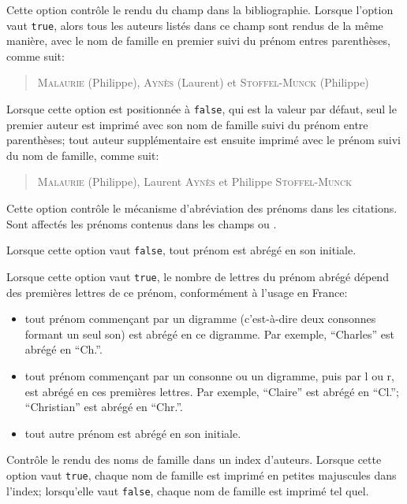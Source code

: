\documentclass{ltxdockit}
\begin{document}
\begin{optionlist}
Cette option contrôle le rendu du champ  dans la bibliographie. Lorsque l'option vaut \texttt{true}, alors tous les auteurs listés dans ce champ sont rendus de la même manière, avec le nom de famille en premier suivi du prénom entres parenthèses, comme suit:
\begin{quote}
\textsc{Malaurie} (Philippe), \textsc{Aynès} (Laurent) et \textsc{Stoffel-Munck} (Philippe) 
\end{quote}

Lorsque cette option est positionnée à \texttt{false}, qui est la valeur par défaut, seul le premier auteur est imprimé avec son nom de famille suivi du prénom entre parenthèses; tout auteur supplémentaire est ensuite imprimé avec le prénom suivi du nom de famille, comme suit:
 
\begin{quote}
\textsc{Malaurie} (Philippe), Laurent \textsc{Aynès} et Philippe \textsc{Stoffel-Munck} 
\end{quote}

Cette option contrôle le mécanisme d'abréviation des prénoms dans les citations. Sont affectés les prénoms contenus dans les champs  ou . 

Lorsque cette option vaut \texttt{false}, tout prénom est abrégé en son initiale.

Lorsque cette option vaut \texttt{true}, le nombre de lettres du prénom abrégé dépend des premières lettres de ce prénom, conformément à l'usage en France:
\begin{itemize}
\item tout prénom commençant par un digramme (c'est-à-dire deux consonnes formant un seul son) est abrégé en ce digramme. Par exemple, \enquote{Charles} est abrégé en \enquote{Ch.}.
\item tout prénom commençant par un consonne ou un digramme, puis par l ou r, est abrégé en ces premières lettres. Par exemple, \enquote{Claire} est abrégé en \enquote{Cl.}; \enquote{Christian} est abrégé en \enquote{Chr.}.
\item tout autre prénom est abrégé en son initiale.
\end{itemize}


Contrôle le rendu des noms de famille dans un index d'auteurs. Lorsque cette option vaut \texttt{true}, chaque nom de famille est imprimé en petites majuscules dans l'index; lorsqu'elle vaut \texttt{false}, chaque nom de famille est imprimé tel quel.

\end{optionlist}
\end{document}
